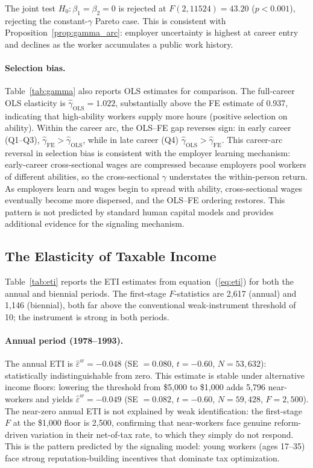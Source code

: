 \documentclass[12pt]{article}
\theoremstyle{definition}
\theoremstyle{remark}
\begin{document}
The joint test $H_0\colon \beta_1 = \beta_2 = 0$ is rejected at $F(2, 11524) = 43.20$
($p < 0.001$), rejecting the constant-$\gamma$ Pareto case. This is consistent with
Proposition~\ref{prop:gamma_arc}: employer uncertainty is highest at career entry and declines
as the worker accumulates a public work history.

\paragraph{Selection bias.} Table~\ref{tab:gamma} also reports OLS estimates for comparison.
The full-career OLS elasticity is $\hat{\gamma}_{\text{OLS}} = 1.022$, substantially above
the FE estimate of 0.937, indicating that high-ability workers supply more hours
(positive selection on ability). Within the career arc, the OLS--FE gap reverses sign: in
early career (Q1--Q3), $\hat{\gamma}_{\text{FE}} > \hat{\gamma}_{\text{OLS}}$, while in late
career (Q4) $\hat{\gamma}_{\text{OLS}} > \hat{\gamma}_{\text{FE}}$. This career-arc reversal
in selection bias is consistent with the employer learning mechanism: early-career
cross-sectional wages are compressed because employers pool workers of different abilities,
so the cross-sectional $\gamma$ understates the within-person return. As employers learn
and wages begin to spread with ability, cross-sectional wages eventually become more
dispersed, and the OLS--FE ordering restores. This pattern is not predicted by standard
human capital models and provides additional evidence for the signaling mechanism.

\subsection{The Elasticity of Taxable Income}

Table~\ref{tab:eti} reports the ETI estimates from equation~(\ref{eq:eti}) for both the
annual and biennial periods. The first-stage $F$-statistics are 2,617 (annual) and 1,146
(biennial), both far above the conventional weak-instrument threshold of 10; the instrument
is strong in both periods.

\paragraph{Annual period (1978--1993).} The annual ETI is $\hat{\varepsilon}^w = -0.048$
(SE $= 0.080$, $t = -0.60$, $N = 53{,}632$): statistically indistinguishable from zero.
This estimate is stable under alternative income floors: lowering the threshold from \$5,000
to \$1,000 adds 5,796 near-workers and yields $\hat{\varepsilon}^w = -0.049$ (SE $= 0.082$,
$t = -0.60$, $N = 59{,}428$, $F = 2{,}500$). The near-zero annual ETI is not explained by
weak identification: the first-stage $F$ at the \$1,000 floor is 2,500, confirming that
near-workers face genuine reform-driven variation in their net-of-tax rate, to which they
simply do not respond. This is the pattern predicted by the signaling model: young workers
(ages 17--35) face strong reputation-building incentives that dominate tax optimization.
\end{document}
